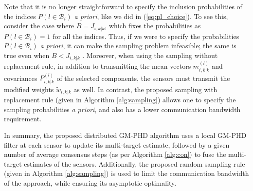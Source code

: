 Note that it is no longer straightforward to specify the inclusion probabilities of the indices $P( l\in \mathcal B_i )$ \textit{a priori}, like we did in (\ref{eq:pl_choice}). To see this, consider the case where $B=J_{i,k|k}$, which fixes the probabilities as $P( l\in \mathcal B_i )=1$ for all the indices. Thus, if we were to specify the probabilities $P( l\in \mathcal B_i )$ \textit{a priori}, it can make the sampling problem infeasible; the same is true even when $B<J_{i,k|k}$ \cite[Example 2]{Efraimidis2015}. Moreover, when using the sampling without replacement rule, in addition to transmitting the mean vectors $m^{(l)}_{i,k|k}$ and covariances $P^{(l)}_{i,k|k}$ of the selected components, the sensors must transmit the modified weights $\tilde w_{i,k|k}$ as well. In contrast, the proposed sampling with replacement rule (given in Algorithm \ref{alg:sampling}) allows one to specify the sampling probabilities \textit{a priori}, and also has a lower communication bandwidth requirement.

In summary, the proposed distributed GM-PHD algorithm uses a local GM-PHD filter at each sensor to update its multi-target estimate, followed by a given number of average consensus steps (as per Algorithm \ref{alg:con}) to fuse the multi-target estimates of the sensors. Additionally, the proposed random sampling rule (given in Algorithm \ref{alg:sampling}) is used to limit the communication bandwidth of the approach, while ensuring its asymptotic optimality.